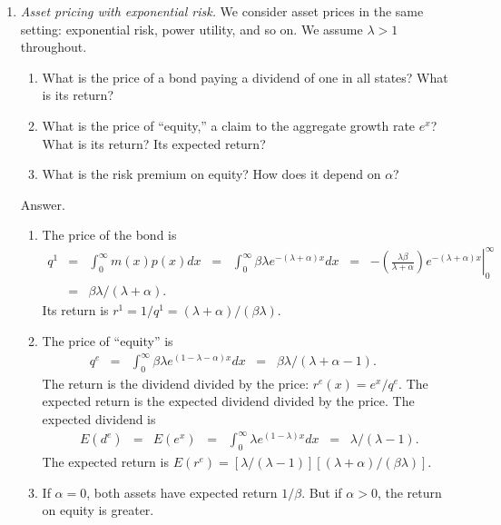 \documentclass[11pt]{article}
\begin{document}
\begin{enumerate}
\item {\it Asset pricing with exponential risk.\/}
We consider asset prices in the same setting:
exponential risk, power utility, and so on.
We assume $\lambda > 1$ throughout.
\begin{enumerate}
\item What is the price of a bond paying a dividend of one in all states?
What is its return?
\item What is the price of ``equity,'' a claim to the aggregate growth rate $e^x$?
What is its return?  Its expected return?
\item What is the risk premium on equity?  How does it depend on $\alpha$?
\end{enumerate}
%
Answer.
\begin{enumerate}
\item The price of the bond is
\begin{eqnarray*}
    q^1 &=& \int_{0}^\infty  m(x) p(x) dx
            \;\;=\;\; \int_{0}^\infty \beta \lambda e^{-(\lambda + \alpha) x} dx
            \;\;=\;\; \left. - \left( \frac{\lambda \beta}{\lambda + \alpha} \right) e^{-(\lambda + \alpha) x} \right|_0^\infty  \\
        &=& \beta \lambda /(\lambda + \alpha) . \phantom{sum^K}
\end{eqnarray*}
Its return is $r^1 = 1/q^1 = (\lambda + \alpha)/(\beta \lambda )$.

\item The price of ``equity'' is
\begin{eqnarray*}
    q^e &=& \int_{0}^\infty \beta \lambda e^{(1-\lambda -\alpha) x} dx
            \;\;=\;\; \beta \lambda /(\lambda + \alpha-1) . \phantom{sum^K}
\end{eqnarray*}
The return is the dividend divided by the price:  $r^e(x) = e^x/q^e$.
The expected return is the expected dividend divided by the price.
The expected dividend is
\begin{eqnarray*}
    E(d^e) &=& E(e^x) \;\;=\;\; \int_{0}^\infty \lambda e^{(1-\lambda) x} dx
            \;\;=\;\; \lambda/(\lambda-1) .
\end{eqnarray*}
The expected return is $ E(r^e) = [\lambda/(\lambda-1)] [(\lambda+\alpha)/(\beta \lambda) ]$.

\item If $\alpha = 0$, both assets have expected return $1/\beta$.
But if $\alpha > 0$, the return on equity is greater.

\end{enumerate}
\end{enumerate}
\end{document}
